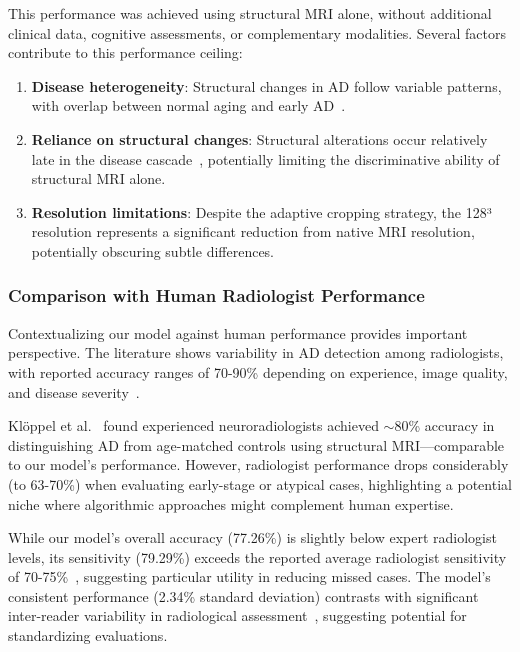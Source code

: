 \documentclass[12pt, a4paper]{article}
\begin{document}
This performance was achieved using structural MRI alone, without additional clinical data, cognitive assessments, or complementary modalities. Several factors contribute to this performance ceiling:

\begin{enumerate}
    \item \textbf{Disease heterogeneity}: Structural changes in AD follow variable patterns, with overlap between normal aging and early AD~\cite{vemuri2010role}.
    
    \item \textbf{Reliance on structural changes}: Structural alterations occur relatively late in the disease cascade~\cite{jack2013tracking}, potentially limiting the discriminative ability of structural MRI alone.
    
    \item \textbf{Resolution limitations}: Despite the adaptive cropping strategy, the 128³ resolution represents a significant reduction from native MRI resolution, potentially obscuring subtle differences.
\end{enumerate}

\subsubsection{Comparison with Human Radiologist Performance}

Contextualizing our model against human performance provides important perspective. The literature shows variability in AD detection among radiologists, with reported accuracy ranges of 70-90\% depending on experience, image quality, and disease severity~\cite{kloppel2008accuracy, frisoni2010clinical}.

Klöppel et al.~\cite{kloppel2008accuracy} found experienced neuroradiologists achieved $\sim$80\% accuracy in distinguishing AD from age-matched controls using structural MRI—comparable to our model's performance. However, radiologist performance drops considerably (to 63-70\%) when evaluating early-stage or atypical cases, highlighting a potential niche where algorithmic approaches might complement human expertise.

While our model's overall accuracy (77.26\%) is slightly below expert radiologist levels, its sensitivity (79.29\%) exceeds the reported average radiologist sensitivity of 70-75\%~\cite{frisoni2010clinical}, suggesting particular utility in reducing missed cases. The model's consistent performance (2.34\% standard deviation) contrasts with significant inter-reader variability in radiological assessment~\cite{kloppel2008accuracy}, suggesting potential for standardizing evaluations.
\end{document}
